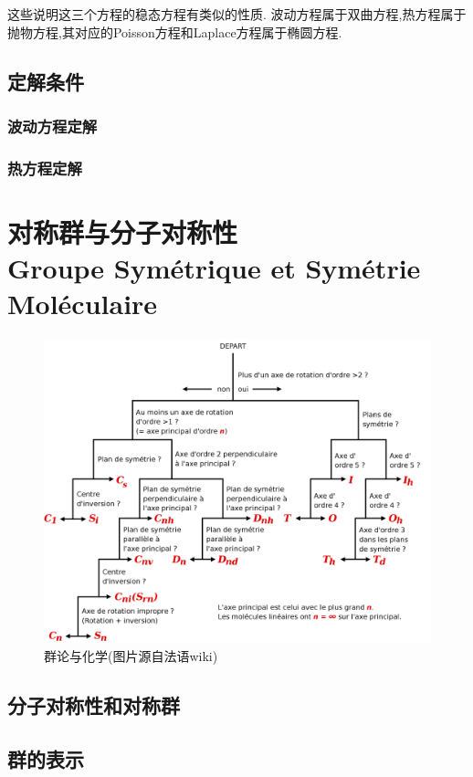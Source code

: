 \documentclass[12pt, a4paper, oneside]{ctexbook}
\begin{document}
这些说明这三个方程的稳态方程有类似的性质.
波动方程属于双曲方程,热方程属于抛物方程,其对应的Poisson方程和Laplace方程属于椭圆方程.
\section{定解条件}
\subsection{波动方程定解}
\subsection{热方程定解}




\chapter{对称群与分子对称性\\ Groupe Symétrique et Symétrie Moléculaire}
\begin{figure}[H]%
  \centering
  \includegraphics[scale=0.15]{groupe_chimie.png}
  \caption{群论与化学(图片源自法语wiki)}
  \label{myref:groupechimie}
\end{figure}
\section{分子对称性和对称群}
\section{群的表示}
\end{document}
